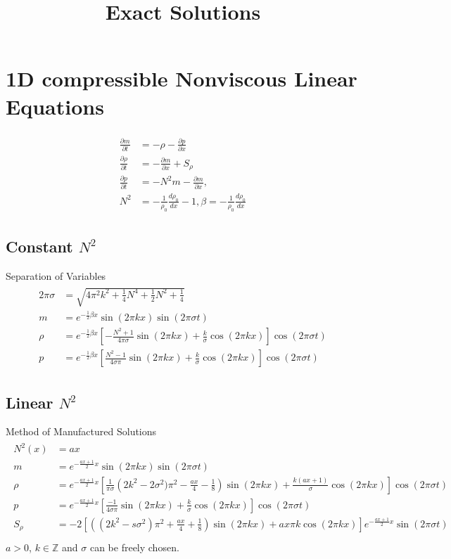 \documentclass{article}
\title{Exact Solutions}
\begin{document}
\section{1D compressible Nonviscous Linear Equations}
\begin{align} \begin{split}
	\frac{\partial m}{\partial t} &= -\rho -\frac{\partial p}{\partial x} \\
	\frac{\partial \rho}{\partial t} &= - \frac{\partial m}{\partial x} + S_\rho \\
	\frac{\partial p}{\partial t} &= - N^2 m - \frac{\partial m}{\partial x}, \\
	N^2 &= - \frac{1}{\rho_0}\frac{d \rho_0}{dx} - 1, \beta = - \frac{1}{\rho_0}\frac{d \rho_0}{dx}
\end{split} \end{align}
\subsection{Constant $N^2$}
Separation of Variables
\begin{align} \begin{split}
	2 \pi \sigma &= \sqrt{4 \pi^2 k^2 + \frac{1}{4} N^4 + \frac{1}{2} N^2 + \frac{1}{4}} \\
	m &= e^{-\frac{1}{2} \beta x} \sin(2\pi k x) \sin(2 \pi \sigma t) \\
	\rho &= e^{-\frac{1}{2} \beta x} \left[ -\frac{N^2+1}{4 \pi \sigma} \sin(2\pi k x) + \frac{k}{\sigma} \cos(2\pi k x)\right] \cos(2\pi \sigma t) \\
	p &=  e^{-\frac{1}{2}\beta x} \left[ \frac{N^2-1}{4 \sigma \pi} \sin(2\pi k x) + \frac{k}{\sigma}\cos(2\pi k x)\right] \cos(2\pi \sigma t)
\end{split} \end{align}
\subsection{Linear $N^2$}
Method of Manufactured Solutions
\begin{align} \begin{split}
	N^2(x) &= a x\\ 
	m &= e^{-\frac{ax+1}{2} x} \sin(2\pi k x) \sin(2 \pi \sigma t) \\
	\rho &= e^{-\frac{ax+1}{2} x} \left[ \frac{1}{\pi\sigma}  \left(2k^2-2\sigma^2)\pi^2-\frac{a x}{4} -\frac{1}{8}\right)\sin(2\pi k x) + \frac{k(ax+1)}{\sigma}\cos(2\pi k x)\right] \cos(2\pi \sigma t) \\
	p &=  e^{-\frac{ax+1}{2} x} \left[ \frac{-1}{4 \sigma \pi} \sin(2\pi k x) + \frac{k}{\sigma}\cos(2\pi k x)\right] \cos(2\pi \sigma t) \\
	S_\rho &= -2 \left[ \left((2k^2-s \sigma^2)\pi^2 + \frac{a x}{4} + \frac{1}{8}\right)\sin(2\pi k x) + a x \pi k \cos(2\pi k x)\right] e^{-\frac{ax+1}{2} x} \sin(2\pi \sigma t) \\
\end{split} \end{align}
$a>0$, $k \in \mathbb{Z}$ and $\sigma$ can be freely chosen. 
\end{document}
